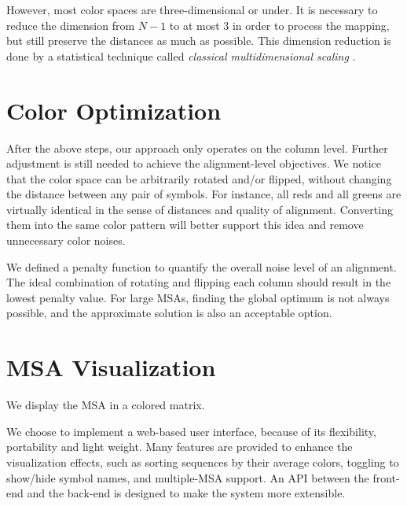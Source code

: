 However, most color spaces are three-dimensional or under. It is necessary to reduce the dimension from $N-1$ to at most 3 in order to process the mapping, but still preserve the distances as much as possible. This dimension reduction is done by a statistical technique called \emph{classical multidimensional scaling} \cite{Borg:1997aa}.

\section{Color Optimization}

After the above steps, our approach only operates on the column level. Further adjustment is still needed to achieve the alignment-level objectives. We notice that the color space can be arbitrarily rotated and/or flipped, without changing the distance between any pair of symbols. For instance, all reds and all greens are virtually identical in the sense of distances and quality of alignment. Converting them into the same color pattern will better support this idea and remove unnecessary color noises.

We defined a penalty function to quantify the overall noise level of an alignment. The ideal combination of rotating and flipping each column should result in the lowest penalty value. For large MSAs, finding the global optimum is not always possible, and the approximate solution is also an acceptable option.

\section{MSA Visualization}

We display the MSA in a colored matrix. 

We choose to implement a web-based user interface, because of its flexibility, portability and light weight. Many features are provided to enhance the visualization effects, such as sorting sequences by their average colors, toggling to show/hide symbol names, and multiple-MSA support. An API between the front-end and the back-end is designed to make the system more extensible.